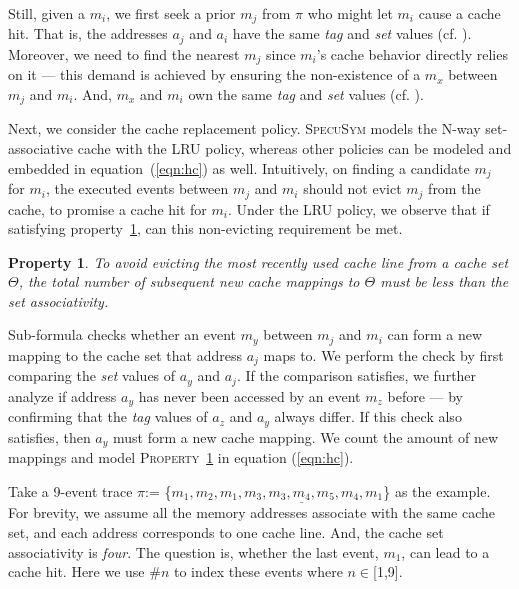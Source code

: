 \documentclass[sigconf,screen]{acmart}
\newcommand*\circled[1]{\tikz[baseline=(char.base)]{
				\node[shape=circle,draw,inner sep=1pt] (char) {\scriptsize{#1}};}}
\newcommand{\SpecuSym}{\textsc{SpecuSym} }
\newtheorem{pro}{Property}
\begin{document}
Still, given a $\mathit{m_i}$, we first seek a prior $\mathit{m_j}$ 
from $\pi$ who might let $\mathit{m_i}$ cause a cache hit. That is, the 
addresses $\mathit{a_j}$ and $\mathit{a_i}$ have the same \emph{tag} 
and \emph{set} values (cf. \circled{4}). Moreover, we need to find the 
nearest $\mathit{m_j}$ since $\mathit{m_i}$'s cache behavior directly 
relies on it --- this demand is achieved by ensuring the non-existence 
of a $\mathit{m_x}$ between $\mathit{m_j}$ and $\mathit{m_i}$. And, 
$\mathit{m_x}$ and $\mathit{m_i}$ own the same \textit{tag} and 
\textit{set} values (cf. \circled{5}).


Next, we consider the cache replacement policy. \SpecuSym models the N-way 
set-associative cache with the LRU policy, whereas other policies can be 
modeled and embedded in equation~(\ref{eqn:hc}) as well. Intuitively, on 
finding a candidate $\mathit{m_j}$ for $\mathit{m_i}$, the executed events 
between $\mathit{m_j}$ and $\mathit{m_i}$ should not evict $\mathit{m_j}$ 
from the cache, to promise a cache hit for $\mathit{m_i}$. Under the LRU 
policy, we observe that if satisfying property~\ref{pro:p1}, can this 
non-evicting requirement be met.
%
\begin{pro}
  \label{pro:p1}
  To avoid evicting the most recently used cache line from a cache set 
  $\Theta$, the total number of subsequent new cache mappings to 
	$\Theta$ must be less than the set associativity.
\end{pro}
%
Sub-formula \circled{6} checks whether an event $\mathit{m_y}$ between 
$\mathit{m_j}$ and $\mathit{m_i}$ can form a new mapping to the cache 
set that address $\mathit{a_j}$ maps to. We perform the check by first 
comparing the \textit{set} values of $\mathit{a_y}$ and $\mathit{a_j}$. 
If the comparison satisfies, we further analyze if address $\mathit{a_y}$ 
has never been accessed by an event $\mathit{m_z}$ before --- by confirming 
that the \emph{tag} values of $\mathit{a_z}$ and $\mathit{a_y}$ always
differ. If this check also satisfies, then $\mathit{a_y}$ must form a new 
cache mapping. We count the amount of new mappings and model 
\textsc{Property}~\ref{pro:p1} in equation (\ref{eqn:hc}).


Take a 9-event trace $\pi$:=
\{$\mathit{m_1,m_2,\underline{m_1,m_3,m_3,m_4,m_5,m_4,m_1}}$\} as the 
example. For brevity, we assume all the memory addresses associate with 
the same cache set, and each address corresponds to one cache line. And, 
the cache set associativity is \textit{four}. The question is, whether 
the last event, $\mathit{m_1}$, can lead to a cache hit. Here we use 
\#$n$ to index these events where $n\in$[1,9].
\end{document}
